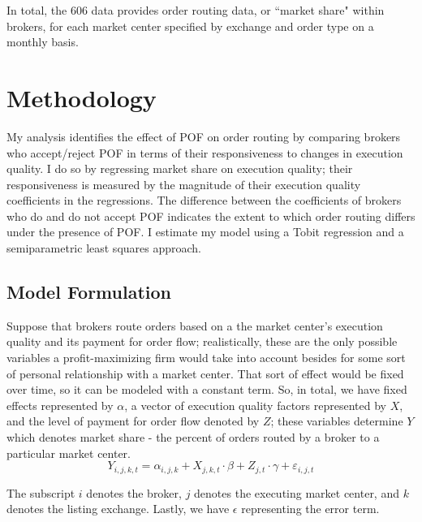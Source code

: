 \documentclass[12pt,a4paper]{extarticle}
\begin{document}
		In total, the 606 data provides order routing data, or ``market share" within brokers, for each market center specified by exchange and order type on a monthly basis. 


	

\section{Methodology}

	My analysis identifies the effect of POF on order routing by comparing brokers who accept/reject POF in terms of their responsiveness to changes in execution quality. I do so by regressing market share on execution quality; their responsiveness is measured by the magnitude of their execution quality coefficients in the regressions. The difference between the coefficients of brokers who do and do not accept POF indicates the extent to which order routing differs under the presence of POF. I estimate my model using a Tobit regression and a semiparametric least squares approach. 

	\subsection{Model Formulation}

	Suppose that brokers route orders based on a the market center's execution quality and its payment for order flow; realistically, these are the only possible variables a profit-maximizing firm would take into account besides for some sort of personal relationship with a market center. That sort of effect would be fixed over time, so it can be modeled with a constant term. So, in total, we have fixed effects represented by $\alpha$, a vector of execution quality factors represented by $X$, and the level of payment for order flow denoted by $Z$; these variables determine $Y$ which denotes market share - the percent of orders routed by a broker to a particular market center. 
	\begin{equation}
	Y_{i, j, k, t} = \alpha_{i,j,k} +  X_{j, k, t} \cdot \beta +   Z_{j,  t} \cdot \gamma + \varepsilon_{i, j, t}
	\end{equation}	
	
	The subscript $i$ denotes the broker, $j$ denotes the executing market center, and $k$ denotes the listing exchange. Lastly, we have $\epsilon$ representing the error term.
	
\end{document}
